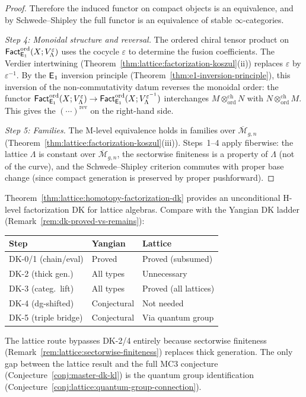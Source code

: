 \begin{proof}
Therefore the induced functor on compact objects is an
equivalence, and by Schwede--Shipley the full functor is an
equivalence of stable $\infty$-categories.

\emph{Step 4: Monoidal structure and reversal.}
The ordered chiral tensor product on
$\mathsf{Fact}_{\mathsf{E}_1}^{\mathrm{ord}}(X; V_\Lambda^\varepsilon)$ uses the cocycle
$\varepsilon$ to determine the fusion coefficients.  The Verdier
intertwining
(Theorem~\ref{thm:lattice:factorization-koszul}(ii)) replaces
$\varepsilon$ by $\varepsilon^{-1}$.  By the $\mathsf{E}_1$ inversion
principle (Theorem~\ref{thm:e1-inversion-principle}), this
inversion of the non-commutativity datum reverses the monoidal
order: the functor
$\mathsf{Fact}_{\mathsf{E}_1}^{\mathrm{ord}}(X; V_\Lambda^\varepsilon) \to
\mathsf{Fact}_{\mathsf{E}_1}^{\mathrm{ord}}(X; V_\Lambda^{\varepsilon^{-1}})$ interchanges
$M \otimes^{\mathrm{ch}}_{\mathrm{ord}} N$ with
$N \otimes^{\mathrm{ch}}_{\mathrm{ord}} M$.  This gives the
$(\cdots)^{\mathrm{rev}}$ on the right-hand side.

\emph{Step 5: Families.}
The M-level equivalence holds in families over
$\overline{\mathcal{M}}_{g,n}$
(Theorem~\ref{thm:lattice:factorization-koszul}(iii)).
Steps~1--4 apply fiberwise: the lattice $\Lambda$ is constant over
$\overline{\mathcal{M}}_{g,n}$, the sectorwise finiteness is a
property of $\Lambda$ (not of the curve), and the Schwede--Shipley
criterion commutes with proper base change (since compact
generation is preserved by proper pushforward).
\end{proof}


\begin{remark}
\label{rem:lattice:comparison-yangian-dk}
Theorem~\ref{thm:lattice:homotopy-factorization-dk} provides an
unconditional H-level factorization DK for lattice algebras.
Compare with the Yangian DK ladder
(Remark~\ref{rem:dk-proved-vs-remains}):
\begin{center}
\renewcommand{\arraystretch}{1.4}
\begin{tabular}{l l l}
\textbf{Step} & \textbf{Yangian} & \textbf{Lattice} \\
\hline
DK-0/1 (chain/eval) & Proved & Proved (subsumed) \\
DK-2 (thick gen.) & All types & Unnecessary \\
DK-3 (categ.\ lift) & All types & Proved (all lattices) \\
DK-4 (dg-shifted) & Conjectural & Not needed \\
DK-5 (triple bridge) & Conjectural & Via quantum group \\
\end{tabular}
\end{center}
The lattice route bypasses DK-2/4 entirely because sectorwise
finiteness (Remark~\ref{rem:lattice:sectorwise-finiteness}) replaces
thick generation.  The only gap between the lattice result and the
full MC3 conjecture (Conjecture~\ref{conj:master-dk-kl}) is the
quantum group identification
(Conjecture~\ref{conj:lattice:quantum-group-connection}).
\end{remark}


